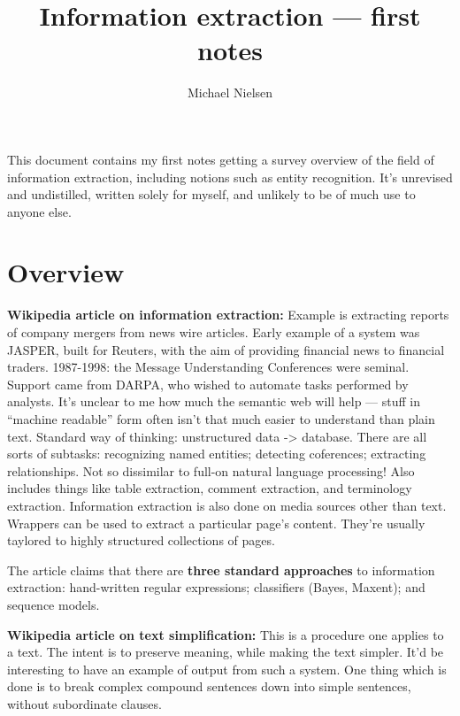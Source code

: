 
\title{Information extraction --- first notes}
\author{Michael Nielsen}



\maketitle

This document contains my first notes getting a survey overview of the
field of information extraction, including notions such as entity
recognition.  It's unrevised and undistilled, written solely for
myself, and unlikely to be of much use to anyone else.


\section{Overview}

\textbf{Wikipedia article on information extraction:} Example is
extracting reports of company mergers from news wire articles.  Early
example of a system was JASPER, built for Reuters, with the aim of
providing financial news to financial traders.  1987-1998: the Message
Understanding Conferences were seminal.  Support came from DARPA, who
wished to automate tasks performed by analysts.  It's unclear to me
how much the semantic web will help --- stuff in ``machine readable''
form often isn't that much easier to understand than plain text.
Standard way of thinking: unstructured data -> database.  There are
all sorts of subtasks: recognizing named entities; detecting
coferences; extracting relationships.  Not so dissimilar to full-on
natural language processing! Also includes things like table
extraction, comment extraction, and terminology extraction.
Information extraction is also done on media sources other than text.
Wrappers can be used to extract a particular page's content.  They're
usually taylored to highly structured collections of pages.

The article claims that there are \textbf{three standard approaches}
to information extraction: hand-written regular expressions;
classifiers (Bayes, Maxent); and sequence models.

\textbf{Wikipedia article on text simplification:} This is a procedure
one applies to a text.  The intent is to preserve meaning, while
making the text simpler.  It'd be interesting to have an example of
output from such a system.  One thing which is done is to break
complex compound sentences down into simple sentences, without
subordinate clauses.


